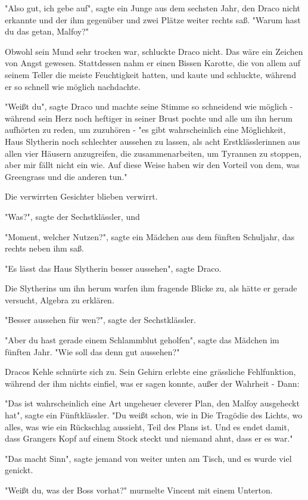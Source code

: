 {"Also gut, ich gebe auf", sagte ein Junge aus dem sechsten Jahr, den Draco nicht erkannte und der ihm gegenüber und zwei Plätze weiter rechts saß. "Warum hast du das getan, Malfoy?"

Obwohl sein Mund sehr trocken war, schluckte Draco nicht. Das wäre ein Zeichen von Angst gewesen. Stattdessen nahm er einen Bissen Karotte, die von allem auf seinem Teller die meiste Feuchtigkeit hatten, und kaute und schluckte, während er so schnell wie möglich nachdachte.

"Weißt du", sagte Draco und machte seine Stimme so schneidend wie möglich - während sein Herz noch heftiger in seiner Brust pochte und alle um ihn herum aufhörten zu reden, um zuzuhören - "es gibt wahrscheinlich eine Möglichkeit, Haus Slytherin noch schlechter aussehen zu lassen, als acht Erstklässlerinnen aus allen vier Häusern anzugreifen, die zusammenarbeiten, um Tyrannen zu stoppen, aber mir fällt nicht ein wie. Auf diese Weise haben wir den Vorteil von dem, was Greengrass und die anderen tun."

Die verwirrten Gesichter blieben verwirrt.

"Was?", sagte der Sechstklässler, und

"Moment, welcher Nutzen?", sagte ein Mädchen aus dem fünften Schuljahr, das rechts neben ihm saß.

"Es lässt das Haus Slytherin besser aussehen", sagte Draco.

Die Slytherins um ihn herum warfen ihm fragende Blicke zu, als hätte er gerade versucht, Algebra zu erklären.

"Besser aussehen für wen?", sagte der Sechstklässler.

"Aber du hast gerade einem Schlammblut geholfen", sagte das Mädchen im fünften Jahr. "Wie soll das denn gut aussehen?"

Dracos Kehle schnürte sich zu. Sein Gehirn erlebte eine grässliche Fehlfunktion, während der ihm nichts einfiel, was er sagen konnte, außer der Wahrheit - Dann:

"Das ist wahrscheinlich eine Art ungeheuer cleverer Plan, den Malfoy ausgeheckt hat", sagte ein Fünftklässler. "Du weißt schon, wie in Die Tragödie des Lichts, wo alles, was wie ein Rückschlag aussieht, Teil des Plans ist. Und es endet damit, dass Grangers Kopf auf einem Stock steckt und niemand ahnt, dass er es war."

"Das macht Sinn", sagte jemand von weiter unten am Tisch, und es wurde viel genickt.

"Weißt du, was der Boss vorhat?" murmelte Vincent mit einem Unterton.

}
